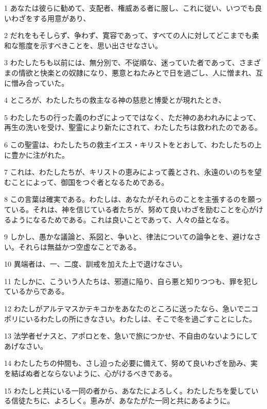 \par 1 あなたは彼らに勧めて、支配者、権威ある者に服し、これに従い、いつでも良いわざをする用意があり、
\par 2 だれをもそしらず、争わず、寛容であって、すべての人に対してどこまでも柔和な態度を示すべきことを、思い出させなさい。
\par 3 わたしたちも以前には、無分別で、不従順な、迷っていた者であって、さまざまの情欲と快楽との奴隷になり、悪意とねたみとで日を過ごし、人に憎まれ、互に憎み合っていた。
\par 4 ところが、わたしたちの救主なる神の慈悲と博愛とが現れたとき、
\par 5 わたしたちの行った義のわざによってではなく、ただ神のあわれみによって、再生の洗いを受け、聖霊により新たにされて、わたしたちは救われたのである。
\par 6 この聖霊は、わたしたちの救主イエス・キリストをとおして、わたしたちの上に豊かに注がれた。
\par 7 これは、わたしたちが、キリストの恵みによって義とされ、永遠のいのちを望むことによって、御国をつぐ者となるためである。
\par 8 この言葉は確実である。わたしは、あなたがそれらのことを主張するのを願っている。それは、神を信じている者たちが、努めて良いわざを励むことを心がけるようになるためである。これは良いことであって、人々の益となる。
\par 9 しかし、愚かな議論と、系図と、争いと、律法についての論争とを、避けなさい。それらは無益かつ空虚なことである。
\par 10 異端者は、一、二度、訓戒を加えた上で退けなさい。
\par 11 たしかに、こういう人たちは、邪道に陥り、自ら悪と知りつつも、罪を犯しているからである。
\par 12 わたしがアルテマスかテキコかをあなたのところに送ったなら、急いでニコポリにいるわたしの所にきなさい。わたしは、そこで冬を過ごすことにした。
\par 13 法学者ゼナスと、アポロとを、急いで旅につかせ、不自由のないようにしてあげなさい。
\par 14 わたしたちの仲間も、さし迫った必要に備えて、努めて良いわざを励み、実を結ばぬ者とならないように、心がけるべきである。
\par 15 わたしと共にいる一同の者から、あなたによろしく。わたしたちを愛している信徒たちに、よろしく。恵みが、あなたがた一同と共にあるように。


